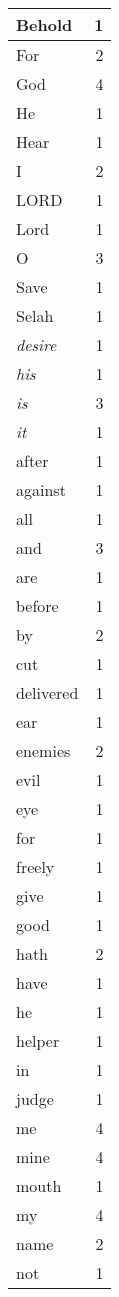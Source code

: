 \begin{center}
\begin{longtable}{l|r}
\hline \hline
\endlastfoot
Behold & 1 \\ \hline
For & 2 \\ \hline
God & 4 \\ \hline
He & 1 \\ \hline
Hear & 1 \\ \hline
I & 2 \\ \hline
LORD & 1 \\ \hline
Lord & 1 \\ \hline
O & 3 \\ \hline
Save & 1 \\ \hline
Selah & 1 \\ \hline
\emph{desire} & 1 \\ \hline
\emph{his} & 1 \\ \hline
\emph{is} & 3 \\ \hline
\emph{it} & 1 \\ \hline
after & 1 \\ \hline
against & 1 \\ \hline
all & 1 \\ \hline
and & 3 \\ \hline
are & 1 \\ \hline
before & 1 \\ \hline
by & 2 \\ \hline
cut & 1 \\ \hline
delivered & 1 \\ \hline
ear & 1 \\ \hline
enemies & 2 \\ \hline
evil & 1 \\ \hline
eye & 1 \\ \hline
for & 1 \\ \hline
freely & 1 \\ \hline
give & 1 \\ \hline
good & 1 \\ \hline
hath & 2 \\ \hline
have & 1 \\ \hline
he & 1 \\ \hline
helper & 1 \\ \hline
in & 1 \\ \hline
judge & 1 \\ \hline
me & 4 \\ \hline
mine & 4 \\ \hline
mouth & 1 \\ \hline
my & 4 \\ \hline
name & 2 \\ \hline
not & 1 \\ \hline

\end{longtable}
\end{center}
